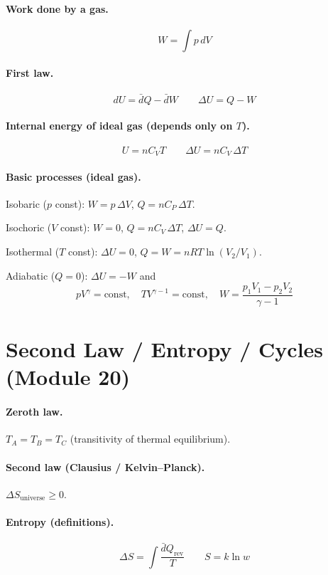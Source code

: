 \documentclass[11pt]{article}
\begin{document}
\paragraph{Work done by a gas.}
\[
W = \int p\,dV
\]

\paragraph{First law.}
\[
dU = \bar{d}Q - \bar{d}W
\qquad
\Delta U = Q - W
\]

\paragraph{Internal energy of ideal gas (depends only on $T$).}
\[
U = n C_{V} T
\qquad
\Delta U = n C_{V}\,\Delta T
\]

\paragraph{Basic processes (ideal gas).}

Isobaric ($p$ const): $W = p\,\Delta V$, $Q = n C_{P}\,\Delta T$.

Isochoric ($V$ const): $W = 0$, $Q = n C_{V}\,\Delta T$, $\Delta U = Q$.

Isothermal ($T$ const): $\Delta U = 0$, $Q = W = n R T\ln(V_{2}/V_{1})$.

Adiabatic ($Q = 0$): $\Delta U = -W$ and
\[
p V^{\gamma} = \text{const},\quad
T V^{\gamma - 1} = \text{const},\quad
W = \frac{p_{1} V_{1} - p_{2} V_{2}}{\gamma - 1}
\]

\section*{Second Law / Entropy / Cycles (Module 20)}

\paragraph{Zeroth law.} $T_{A} = T_{B} = T_{C}$ (transitivity of thermal equilibrium).

\paragraph{Second law (Clausius / Kelvin--Planck).} $\Delta S_{\text{universe}} \ge 0$.

\paragraph{Entropy (definitions).}
\[
\Delta S = \int \frac{\bar{d}Q_{\text{rev}}}{T}
\qquad
S = k\ln w
\]
\end{document}
